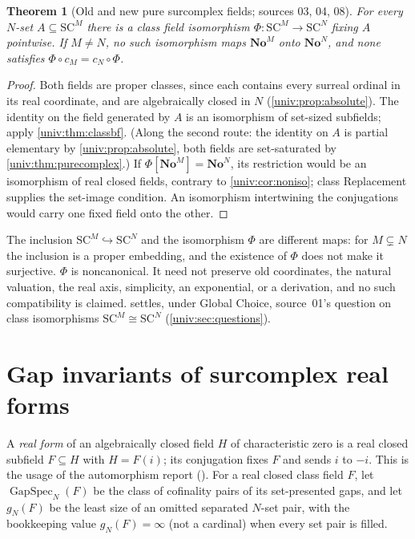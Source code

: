 \documentclass[11pt,letterpaper]{article}
\numberwithin{equation}{section}
\newtheorem{theorem}{Theorem}[section]
\theoremstyle{definition}
\theoremstyle{remark}
\newcommand{\No}{\mathbf{No}}
\newcommand{\SC}{\mathrm{SC}}
\newcommand{\NoM}{\No^{M}}
\newcommand{\NoN}{\No^{N}}
\newcommand{\SCM}{\SC^{M}}
\newcommand{\SCN}{\SC^{N}}
\newcommand{\GapSpec}{\operatorname{GapSpec}}
\begin{document}
\begin{theorem}[Old and new pure surcomplex fields; sources 03, 04, 08]\label{univ:thm:pureiso}
For every $N$-set $A\subseteq\SCM$ there is a class field isomorphism
$\Phi:\SCM\to\SCN$ fixing $A$ pointwise. If $M\ne N$, no such isomorphism maps
$\NoM$ onto $\NoN$, and none satisfies $\Phi\circ c_M=c_N\circ\Phi$.
\end{theorem}
\begin{proof}
Both fields are proper classes, since each contains every surreal ordinal in its
real coordinate, and are algebraically closed in $N$
(\cref{univ:prop:absolute}). The identity on the field generated by $A$ is an
isomorphism of set-sized subfields; apply \cref{univ:thm:classbf}. (Along the
second route: the identity on $A$ is partial elementary by
\cref{univ:prop:absolute}, both fields are set-saturated by
\cref{univ:thm:purecomplex}.) If $\Phi[\NoM]=\NoN$, its restriction would be
an isomorphism of real closed fields, contrary to \cref{univ:cor:noniso}; class
Replacement supplies the set-image condition. An isomorphism intertwining the
conjugations would carry one fixed field onto the other.
\end{proof}

The inclusion $\SCM\hookrightarrow\SCN$ and the isomorphism $\Phi$ are different
maps: for $M\subsetneq N$ the inclusion is a proper embedding, and the existence
of $\Phi$ does not make it surjective. $\Phi$ is noncanonical. It need not
preserve old coordinates, the natural valuation, the real axis, simplicity, an
exponential, or a derivation, and no such compatibility is claimed.
 settles, under Global Choice, source~01's question on
class isomorphisms $\SCM\cong\SCN$ (\cref{univ:sec:questions}).

\section{Gap invariants of surcomplex real forms}\label{univ:sec:realforms}

A \emph{real form} of an algebraically closed field $H$ of characteristic zero
is a real closed subfield $F\subseteq H$ with $H=F(i)$; its conjugation fixes
$F$ and sends $i$ to $-i$. This is the usage of the automorphism report
(). For a real closed class field $F$, let
$\GapSpec_N(F)$ be the class of cofinality pairs of its set-presented gaps, and
let $g_N(F)$ be the least size of an omitted separated $N$-set pair, with the
bookkeeping value $g_N(F)=\infty$ (not a cardinal) when every set pair is
filled.
\end{document}
